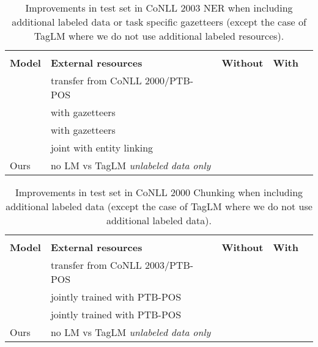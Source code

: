 \documentclass[11pt,a4paper]{article}
\begin{document}
\begin{table*}[t]
\begin{center}
\begin{tabular}{l|p{2.4in}|l|l|l}
\hline \hline
          &                        &  &  & \\
\bf Model & \bf External resources & \bf Without & \bf With &  \\ \hline
\citet{yang-transfer-iclr07} & transfer from CoNLL 2000/PTB-POS &  &  &  \\
\citet{chiu-nichols-2016} & with gazetteers &  &  &  \\
\citet{NLPfromScratch:Collobert2011} & with gazetteers &  &  &  \\
\citet{luo-EtAl:2015:EMNLP2} & joint with entity linking &  &  &  \\
\hline
Ours & no LM vs TagLM \textit{unlabeled data only} &  &  &  \\
\hline \hline
\end{tabular}
\end{center}
\caption{\label{2003-table-aux} Improvements in test set  in CoNLL 2003 NER when including
additional labeled data or task specific gazetteers (except the case of TagLM where we do not use additional labeled resources).}
\end{table*}



\begin{table*}[t]
\begin{center}
\begin{tabular}{l|p{2.4in}|l|l|l}
\hline \hline
          &                        &  &  & \\
\bf Model & \bf External resources & \bf Without & \bf With &  \\ \hline
\citet{yang-transfer-iclr07} & transfer from CoNLL 2003/PTB-POS &  &  &  \\
\citet{joint-many-iclr07} & jointly trained with PTB-POS &  &  &  \\
\citet{Sgaard2016DeepML} & jointly trained with PTB-POS &  &  &  \\
\hline
Ours & no LM vs TagLM \textit{unlabeled data only} &  &  &  \\
\hline \hline
\end{tabular}
\end{center}
\caption{\label{2000-table-aux} Improvements in test set  in CoNLL 2000 Chunking when including additional labeled data (except the case of TagLM where we do not use additional labeled data).}
\end{table*}
\end{document}
